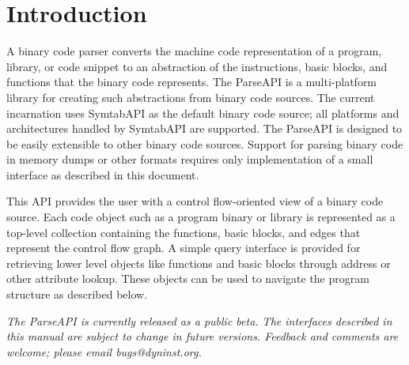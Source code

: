 \documentclass{article}
\begin{document}
\begin{titlepage}
\endpgfgraphicnamed
\end{titlepage}

\tableofcontents
\clearpage

\section{Introduction}
\label{sec:intro}

A binary code parser converts the machine code representation of a
program, library, or code snippet to an abstraction of the instructions, basic
blocks, and functions that the binary code represents. The ParseAPI is a
multi-platform library for creating such abstractions from binary code sources.
The current incarnation uses SymtabAPI as the default binary code source; all
platforms and architectures handled by SymtabAPI are supported. The ParseAPI is
designed to be easily extensible to other binary code sources. Support for
parsing binary code in memory dumps or other formats requires only
implementation of a small interface as described in this document.

This API provides the user with a control flow-oriented view of a binary code
source. Each code object such as a program binary or library is represented as
a top-level collection containing the functions, basic blocks, and edges that
represent the control flow graph. A simple query interface is provided for
retrieving lower level objects like functions and basic blocks through address
or other attribute lookup. These objects can be used to navigate the
program structure as described below.

\emph{The ParseAPI is currently released as a public beta. The interfaces described in this manual are subject to change in future versions. Feedback and comments are welcome; please email bugs@dyninst.org.}
\end{document}
